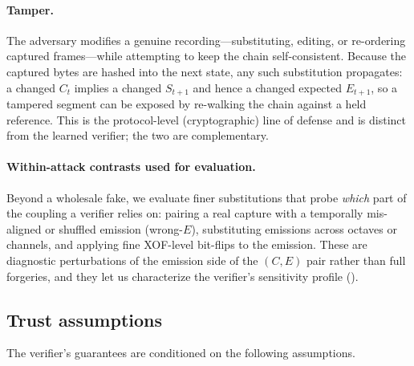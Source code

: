 \paragraph{Tamper.} The adversary modifies a genuine recording---substituting, editing, or re-ordering captured frames---while attempting to keep the chain self-consistent. Because the captured bytes are hashed into the next state, any such substitution propagates: a changed $C_t$ implies a changed $S_{t+1}$ and hence a changed expected $E_{t+1}$, so a tampered segment can be exposed by re-walking the chain against a held reference. This is the protocol-level (cryptographic) line of defense and is distinct from the learned verifier; the two are complementary.

\paragraph{Within-attack contrasts used for evaluation.} Beyond a wholesale fake, we evaluate finer substitutions that probe \emph{which} part of the coupling a verifier relies on: pairing a real capture with a temporally mis-aligned or shuffled emission (wrong-$E$), substituting emissions across octaves or channels, and applying fine XOF-level bit-flips to the emission. These are diagnostic perturbations of the emission side of the $(C,E)$ pair rather than full forgeries, and they let us characterize the verifier's sensitivity profile ().

\subsection{Trust assumptions}
\label{sec:system_threat:trust}

The verifier's guarantees are conditioned on the following assumptions.

